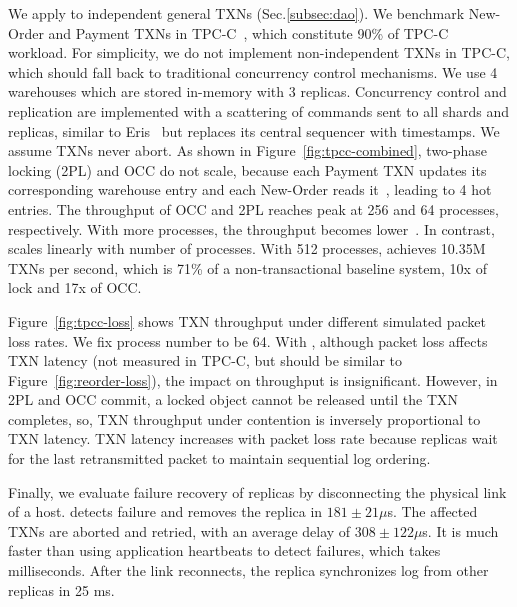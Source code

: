 We apply \sys to independent general TXNs (Sec.\ref{subsec:dao}).
We benchmark New-Order and Payment TXNs in TPC-C~\cite{tpcc}, which constitute 90\% of TPC-C workload.
For simplicity, we do not implement non-independent TXNs in TPC-C, which should fall back to traditional concurrency control mechanisms.
We use 4 warehouses which are stored in-memory with 3 replicas.
Concurrency control and replication are implemented with a scattering of commands sent to all shards and replicas, similar to Eris~\cite{eris} but replaces its central sequencer with timestamps.
We assume TXNs never abort.
As shown in Figure~\ref{fig:tpcc-combined}, two-phase locking (2PL) and OCC do not scale, because each Payment TXN updates its corresponding warehouse entry and each New-Order reads it~\cite{yu2014staring}, leading to 4 hot entries.
The throughput of OCC and 2PL reaches peak at 256 and 64 processes, respectively. With more processes, the throughput becomes lower~\cite{mu2014extracting}.
In contrast, \sys{} scales linearly with number of processes. With 512 processes, \sys achieves 10.35M TXNs per second, which is 71\% of a non-transactional baseline system, 10x of lock and 17x of OCC. %

Figure~\ref{fig:tpcc-loss} shows TXN throughput under different simulated packet loss rates.
We fix process number to be 64.
With \sys{}, although packet loss affects TXN latency (not measured in TPC-C, but should be similar to Figure~\ref{fig:reorder-loss}), the impact on throughput is insignificant. %
However, in 2PL and OCC commit, a locked object cannot be released until the TXN completes, so, TXN throughput under contention is inversely proportional to TXN latency.
TXN latency increases with packet loss rate because replicas wait for the last retransmitted packet to maintain sequential log ordering.

Finally, we evaluate failure recovery of replicas by disconnecting the physical link of a host. \sys{} detects failure and removes the replica in $181 \pm 21 \mu$s. The affected TXNs are aborted and retried, with an average delay of $308 \pm 122 \mu$s. It is much faster than using application heartbeats to detect failures, which takes milliseconds. After the link reconnects, the replica synchronizes log from other replicas in 25 ms.

